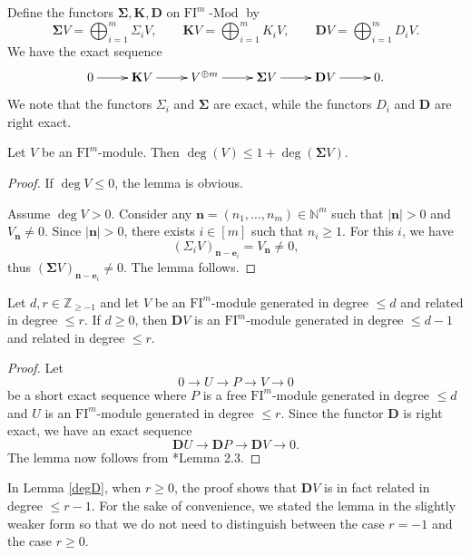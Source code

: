 \documentclass{amsart}
\numberwithin{equation}{section}
\DeclareMathOperator{\Mod}{-Mod}
\newcommand{\N}{{\mathbb{N}}}
\newcommand{\FI}{{\mathrm{FI}}}
\newcommand{\ZZ}{{\mathbb{Z}_{\geqslant -1}}}
\begin{document}
Define the functors $\mathbf{\Sigma}, \mathbf{K}, \mathbf{D}$ on $\FI^m\Mod$ by 
\[ \mathbf{\Sigma}V = \bigoplus_{i=1}^m \Sigma_i V, \qquad
\mathbf{K}V = \bigoplus_{i=1}^m K_i V, \qquad 
\mathbf{D}V = \bigoplus_{i=1}^m D_i V. \]
We have the exact sequence
\[ \xymatrix{
   0 \ar[r] & \mathbf{K} V  \ar[r] & V^{\oplus m}  \ar[r] & \mathbf{\Sigma} V  \ar[r] & \mathbf{D} V  \ar[r] & 0. } \]
We note that the functors $\Sigma_i$ and $\mathbf{\Sigma}$ are exact, while the functors $D_i$ and $\mathbf{D}$ are right exact.


\begin{lemma} \label{degS}
   Let $V$ be an $\FI^m$-module. Then $\deg(V) \leqslant 1 + \deg(\mathbf{\Sigma} V)$. 
\end{lemma}

\begin{proof}
   If $\deg V\leqslant 0$, the lemma is obvious. 
   
   Assume $\deg V > 0$. Consider any $\mathbf{n}=(n_1,\ldots,n_m)\in \N^m$ such that $|\mathbf{n}|>0$ and $V_{\mathbf{n}}\neq 0$. Since $|\mathbf{n}|>0$, there exists $i\in[m]$ such that $n_i\geqslant 1$. For this $i$, we have 
   \[ (\Sigma_i V)_{\mathbf{n} - \mathbf{e}_i}=V_{\mathbf{n}}\neq 0, \] 
   thus $(\mathbf{\Sigma} V)_{\mathbf{n} - \mathbf{e}_i}\neq 0$. The lemma follows.
\end{proof}


\begin{lemma} \label{degD}
   Let $d,r\in\ZZ$ and let $V$ be an $\FI^m$-module generated in degree $\leqslant d$ and related in degree $\leqslant r$. If $d\geqslant 0$, then $\mathbf{D}V$ is an $\FI^m$-module generated in degree $\leqslant d-1$ and related in degree $\leqslant r$. 
\end{lemma}
\begin{proof}
   Let
   \[ 0 \to U \to P \to V \to 0\]
   be a short exact sequence where $P$ is a free $\FI^m$-module generated in degree $\leqslant d$ and $U$ is an $\FI^m$-module generated in degree $\leqslant r$. Since the functor $\mathbf{D}$ is right exact, we have an exact sequence 
   \[ \mathbf{D}U \to \mathbf{D}P \to \mathbf{D}V \to 0. \]
   The lemma now follows from \cite{liyu}*{Lemma 2.3}.
\end{proof}

In Lemma \ref{degD}, when $r\geqslant 0$, the proof shows that $\mathbf{D}V$ is in fact related in degree $\leqslant r-1$. For the sake of convenience, we stated the lemma in the slightly weaker form so that we do not need to distinguish between the case $r=-1$ and the case $r\geqslant 0$.
\end{document}
